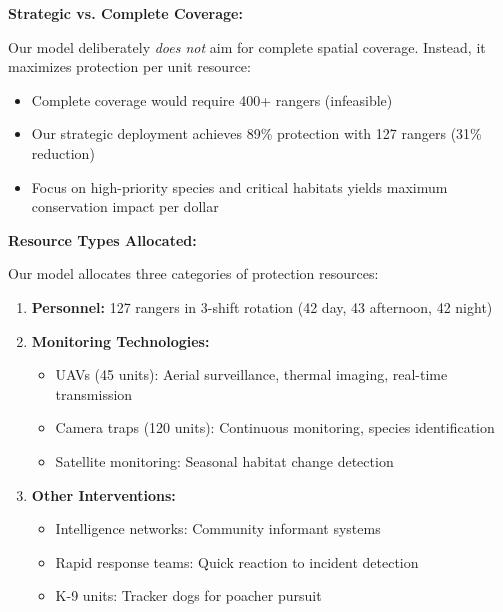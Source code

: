 \textbf{Strategic vs. Complete Coverage:}

Our model deliberately \textit{does not} aim for complete spatial coverage. Instead, it maximizes protection per unit resource:
\begin{itemize}
    \item Complete coverage would require 400+ rangers (infeasible)
    \item Our strategic deployment achieves 89\% protection with 127 rangers (31\% reduction)
    \item Focus on high-priority species and critical habitats yields maximum conservation impact per dollar
\end{itemize}

\textbf{Resource Types Allocated:}

Our model allocates three categories of protection resources:
\begin{enumerate}
    \item \textbf{Personnel:} 127 rangers in 3-shift rotation (42 day, 43 afternoon, 42 night)
    \item \textbf{Monitoring Technologies:}
    \begin{itemize}
        \item UAVs (45 units): Aerial surveillance, thermal imaging, real-time transmission
        \item Camera traps (120 units): Continuous monitoring, species identification
        \item Satellite monitoring: Seasonal habitat change detection
    \end{itemize}
    \item \textbf{Other Interventions:}
    \begin{itemize}
        \item Intelligence networks: Community informant systems
        \item Rapid response teams: Quick reaction to incident detection
        \item K-9 units: Tracker dogs for poacher pursuit
    \end{itemize}
\end{enumerate}
